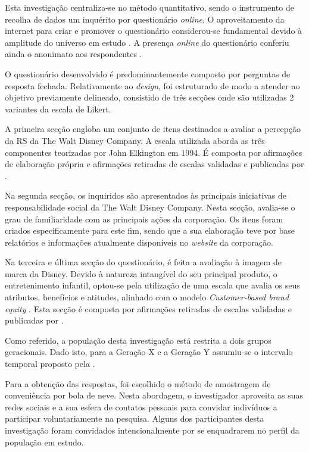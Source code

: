 \documentclass[portuguese]{textolivre}
\begin{document}
Esta investigação centraliza-se no método quantitativo, sendo o instrumento de recolha de dados um inquérito por questionário \textit{online}. O aproveitamento da internet para criar e promover o questionário considerou-se fundamental devido à amplitude do universo em estudo \cite{wright_researching_2005}. A presença \textit{online} do questionário conferiu ainda o anonimato aos respondentes \cite{ritter_introduction_2007}.  

O questionário desenvolvido é predominantemente composto por perguntas de resposta fechada. Relativamente ao \textit{design}, foi estruturado de modo a atender ao objetivo previamente delineado, consistido de três secções onde são utilizadas 2 variantes da escala de Likert. 

A primeira secção engloba um conjunto de itens destinados a avaliar a percepção da RS da The Walt Disney Company. A escala utilizada aborda as três componentes teorizadas por John Elkington em 1994. É composta por afirmações de elaboração própria e afirmações retiradas de escalas validadas e publicadas por \textcite{martinez_effect_2004}.

Na segunda secção, os inquiridos são apresentados às principais iniciativas de responsabilidade social da The Walt Disney Company. Nesta secção, avalia-se o grau de familiaridade com as principais ações da corporação. Os itens foram criados especificamente para este fim, sendo que a sua elaboração teve por base relatórios e informações atualmente disponíveis no \textit{website} da corporação.

Na terceira e última secção do questionário, é feita a avaliação à imagem de marca da Disney. Devido à natureza intangível do seu principal produto, o entretenimento infantil, optou-se pela utilização de uma escala que avalia os seus atributos, benefícios e atitudes, alinhado com o modelo \textit{Customer-based brand equity} \cite{heding_brand_2020}. Esta secção é composta por afirmações retiradas de escalas validadas e publicadas por \textcite{lien_online_2015,martinez_effect_2004}.

Como referido, a população desta investigação está restrita a dois grupos geracionais. Dado isto, para a Geração X e a Geração Y assumiu-se o intervalo temporal proposto pela \textcite{paw_research_center_generations_2019}. 

Para a obtenção das respostas, foi escolhido o método de amostragem de conveniência por bola de neve. Nesta abordagem, o investigador aproveita as suas redes sociais e a sua esfera de contatos pessoais para convidar indivíduos a participar voluntariamente na pesquisa. Alguns dos participantes desta investigação foram convidados intencionalmente por se enquadrarem no perfil da população em estudo. 
\end{document}

